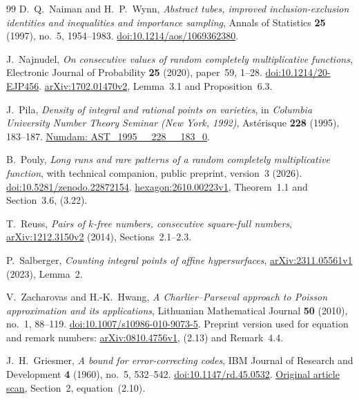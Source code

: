 \begin{thebibliography}{99}
D.~Q.~Naiman and H.~P.~Wynn,
\emph{Abstract tubes, improved inclusion-exclusion identities
and inequalities and importance sampling},
Annals of Statistics \textbf{25} (1997), no.~5, 1954--1983.
\href{https://doi.org/10.1214/aos/1069362380}
{doi:10.1214/aos/1069362380}.

J.~Najnudel,
\emph{On consecutive values of random completely multiplicative
functions},
Electronic Journal of Probability \textbf{25} (2020), paper~59,
1--28.
\href{https://doi.org/10.1214/20-EJP456}
{doi:10.1214/20-EJP456}.
\href{https://arxiv.org/abs/1702.01470v2}
{arXiv:1702.01470v2}, Lemma~3.1 and Proposition~6.3.

J.~Pila,
\emph{Density of integral and rational points on varieties},
in \emph{Columbia University Number Theory Seminar
(New York, 1992)}, Ast\'erisque \textbf{228} (1995),
183--187.
\href{https://www.numdam.org/item/AST_1995__228__183_0/}
{Numdam: AST\_1995\_\_228\_\_183\_0}.

B.~Pouly,
\emph{Long runs and rare patterns of a random completely
multiplicative function}, with technical companion,
public preprint, version~3 (2026).
\href{https://doi.org/10.5281/zenodo.22872154}
{doi:10.5281/zenodo.22872154}.
\href{https://hexagonmath.org/2610.00223v1}
{hexagon:2610.00223v1}, Theorem~1.1 and Section~3.6, (3.22).

T.~Reuss,
\emph{Pairs of \(k\)-free numbers, consecutive square-full
numbers},
\href{https://arxiv.org/abs/1212.3150v2}
{arXiv:1212.3150v2} (2014), Sections~2.1--2.3.

P.~Salberger,
\emph{Counting integral points of affine hypersurfaces},
\href{https://arxiv.org/abs/2311.05561v1}
{arXiv:2311.05561v1} (2023), Lemma~2.

V.~Zacharovas and H.-K.~Hwang,
\emph{A Charlier--Parseval approach to Poisson approximation
and its applications},
Lithuanian Mathematical Journal \textbf{50} (2010), no.~1,
88--119.
\href{https://doi.org/10.1007/s10986-010-9073-5}
{doi:10.1007/s10986-010-9073-5}.
Preprint version used for equation and remark numbers:
\href{https://arxiv.org/abs/0810.4756v1}
{arXiv:0810.4756v1}, (2.13) and Remark~4.4.

J.~H.~Griesmer,
\emph{A bound for error-correcting codes},
IBM Journal of Research and Development \textbf{4} (1960),
no.~5, 532--542.
\href{https://doi.org/10.1147/rd.45.0532}
{doi:10.1147/rd.45.0532}.
\href{https://bitsavers.trailing-edge.com/pdf/ibm/IBM_Journal_of_Research_and_Development/045/ibmrd0405M.pdf}
{Original article scan}, Section~2, equation~(2.10).


\end{thebibliography}
